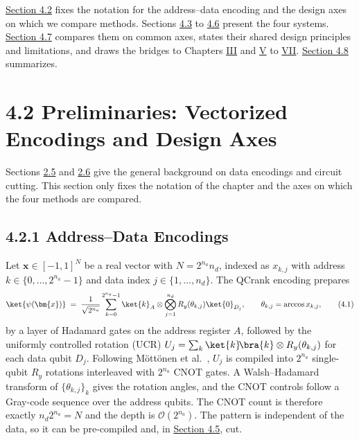 \documentclass{report}
\theoremstyle{plain}
\theoremstyle{definition}
\theoremstyle{remark}
\newcommand{\bigO}[1]{\mathcal{O}\!\left(#1\right)}
\begin{document}
\hyperref[sec:qml:prelim]{Section 4.2} fixes the notation for the address--data encoding and the design axes on which we compare methods. Sections \hyperref[sec:qml:qpie]{4.3} to \hyperref[sec:qml:nnqa]{4.6} present the four systems. \hyperref[sec:qml:synthesis]{Section 4.7} compares them on common axes, states their shared design principles and limitations, and draws the bridges to Chapters \hyperref[ch:qgear]{III} and \hyperref[ch:nisq]{V} to \hyperref[ch:qec]{VII}. \hyperref[sec:qml:summary]{Section 4.8} summarizes.

\section{4.2 Preliminaries: Vectorized Encodings and Design Axes}\label{sec:qml:prelim}

Sections \hyperref[sec:bg:encoding]{2.5} and \hyperref[sec:bg:cutting]{2.6} give the general background on data encodings and circuit cutting. This section only fixes the notation of the chapter and the axes on which the four methods are compared.

\subsection{4.2.1 Address--Data Encodings}\label{sec:qml:prelim:ucr}

Let $\bm{x} \in [-1,1]^{N}$ be a real vector with $N = 2^{n_a} n_d$, indexed as $x_{k,j}$ with address $k \in \{0,\dots,2^{n_a}-1\}$ and data index $j \in \{1,\dots,n_d\}$. The QCrank encoding \cite{balewski2024qcrank} prepares
\hypertarget{eq:qml:qcrank}{}\[
\ket{\psi(\bm{x})} \;=\; \frac{1}{\sqrt{2^{n_a}}} \sum_{k=0}^{2^{n_a}-1} \ket{k}_A \otimes \bigotimes_{j=1}^{n_d} R_y(\theta_{k,j})\ket{0}_{D_j},
\qquad \theta_{k,j} = \arccos x_{k,j},
\tag{4.1}\]
by a layer of Hadamard gates on the address register $A$, followed by the uniformly controlled rotation (UCR) $U_j = \sum_k \ket{k}\!\bra{k} \otimes R_y(\theta_{k,j})$ for each data qubit $D_j$. Following Möttönen et al.~\cite{mottonen2004ucr}, $U_j$ is compiled into $2^{n_a}$ single-qubit $R_y$ rotations interleaved with $2^{n_a}$ CNOT gates. A Walsh--Hadamard transform of $\{\theta_{k,j}\}_k$ gives the rotation angles, and the CNOT controls follow a Gray-code sequence over the address qubits. The CNOT count is therefore exactly $n_d 2^{n_a} = N$ and the depth is $\bigO{2^{n_a}}$. The pattern is independent of the data, so it can be pre-compiled and, in \hyperref[sec:qml:shardq]{Section 4.5}, cut.
\end{document}
